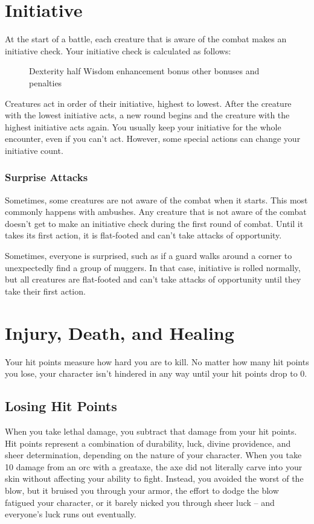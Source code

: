 \section{Initiative}\label{Initiative}

At the start of a battle, each creature that is aware of the combat makes an initiative check. Your initiative check is calculated as follows:

\begin{figure}[h]
    \centering Dexterity \add half Wisdom \add enhancement bonus \add other bonuses and penalties
\end{figure}

Creatures act in order of their initiative, highest to lowest. After the creature with the lowest initiative acts, a new round begins and the creature with the highest initiative acts again. You usually keep your initiative for the whole encounter, even if you can't act. However, some special actions can change your initiative count.

\subsubsection{Surprise Attacks}\label{Surprise Attacks}
Sometimes, some creatures are not aware of the combat when it starts. This most commonly happens with ambushes. Any creature that is not aware of the combat doesn't get to make an initiative check during the first round of combat. Until it takes its first action, it is flat-footed and can't take attacks of opportunity.

Sometimes, everyone is surprised, such as if a guard walks around a corner to unexpectedly find a group of muggers. In that case, initiative is rolled normally, but all creatures are flat-footed and can't take attacks of opportunity until they take their first action.

\section{Injury, Death, and Healing}\label{Injury, Death, and Healing}
Your hit points measure how hard you are to kill. No matter how many hit points you lose, your character isn't hindered in any way until your hit points drop to 0.

\subsection{Losing Hit Points}
When you take lethal damage, you subtract that damage from your hit points.
 Hit points represent a combination of durability, luck, divine providence, and sheer determination, depending on the nature of your character. When you take 10 damage from an orc with a greataxe, the axe did not literally carve into your skin without affecting your ability to fight. Instead, you avoided the worst of the blow, but it bruised you through your armor, the effort to dodge the blow fatigued your character, or it barely nicked you through sheer luck -- and everyone's luck runs out eventually.

